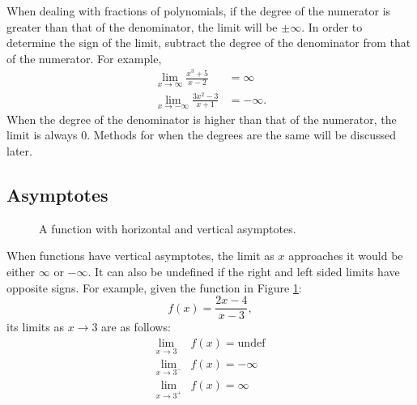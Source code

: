 \documentclass[12pt]{article}
\begin{document}
When dealing with fractions of polynomials, if the degree of the numerator is greater than that of the denominator, the limit will be $\pm \infty$. In order to determine the sign of the limit, subtract the degree of the denominator from that of the numerator. For example,
\begin{align*}
	\lim_{x \to \infty} \frac{x^3 + 5}{x - 2} &= \infty   \\
	\lim_{x \to -\infty} \frac{3x^2 - 3}{x + 1} &= -\infty.
\end{align*}
When the degree of the denominator is higher than that of the numerator, the limit is always $0$. Methods for when the degrees are the same will be discussed later.

\subsection{Asymptotes}
\begin{figure}[H]
	\begin{center}
		\caption{A function with horizontal and vertical asymptotes.}
		\label{fig:limasymptote}
	\end{center}
\end{figure}

When functions have vertical asymptotes, the limit as $x$ approaches it would be either $\infty$ or $-\infty$. It can also be undefined if the right and left sided limits have opposite signs. For example, given the function in Figure \ref{fig:limasymptote}:
\[ f(x) = \frac{2x-4}{x-3}, \]
its limits as $x \to 3$ are as follows:
\begin{align*}
	\lim_{x \to 3} & f(x) = \text{undef} \\
	\lim_{x \to 3^-} & f(x) = -\infty      \\
	\lim_{x \to 3^+} & f(x) = \infty
\end{align*}
\end{document}
